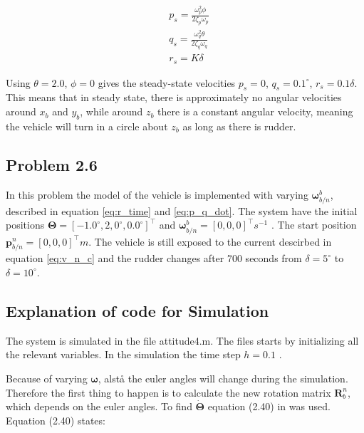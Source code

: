 \begin{equation}
\begin{aligned}
	& p_s = \frac{\omega_p^2 \phi}{ 2\zeta_p\omega_p} \\
	& q_s = \frac{\omega_q^2 \theta}{2\zeta_q\omega_q} \\
	& r_s = K \delta
	\label{eq:p_q_dot}
\end{aligned}
\end{equation}

Using $\theta = 2.0$, $\phi = 0$ gives the steady-state velocities $p_s = 0$, $q_s = 0.1 ^\circ$, $r_s = 0.1 \delta$. This means that in steady state, there is approximately no angular velocities around $x_b$ and $y_b$, while around $z_b$ there is a constant angular velocity, meaning the vehicle will turn in a circle about $z_b$ as long as there is rudder. 

\subsection*{Problem 2.6}

In this problem the model of the vehicle is implemented with varying $\boldsymbol{\omega}^b_{b/n}$, described in equation \eqref{eq:r_time} and \eqref{eq:p_q_dot}. The system have the initial positions $\boldsymbol{\Theta} = [-1.0^\circ, 2,0^\circ, 0.0^\circ]^\top$ and $\boldsymbol{\omega}^b_{b/n} = [0,0,0]^\top s^{-1}$ . The start position $\mathbf{p}^n_{b/n} = [0,0,0]^\top m$. The vehicle is still exposed to the current descirbed in equation \eqref{eq:v_n_c}  and the rudder changes after 700 seconds from $\delta = 5^\circ$ to $\delta = 10^\circ$.

\subsection{Explanation of code for Simulation}

The system is simulated in the file {\color{blue} attitude4.m}. The files starts by initializing all the relevant variables. In the simulation the time step $h = 0.1$ .

Because of varying $\boldsymbol{\omega}$, alstå the euler angles will change during the simulation. Therefore the first thing to happen is to calculate the new rotation matrix $\mathbf{R}^n_b$, which depends on the euler angles. To find $ \dot{\boldsymbol{\Theta}}$ equation (2.40) in \cite{Fossen2011} was used. Equation (2.40) states:

